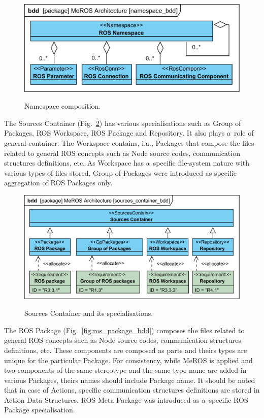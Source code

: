 \documentclass[11pt,oneside,a4paper]{report}
\begin{document}
	
	\begin{figure}[H]
		\centering
		\begin{center}
			{\includegraphics[scale=.94]{diagrams/namespace_bdd.png}}
		\end{center}
		\caption{Namespace composition.}
		\label{fig:namespace_bdd}
	\end{figure}
	
	The Sources Container (Fig.~\ref{fig:sources_container_bdd}) has various specialisations such as Group of Packages, ROS Workspace, ROS Package and Repository. It also plays a~role of general container.  
	The Workspace contains, i.a., Packages that compose the files related to general ROS concepts such as Node source codes, communication structures definitions, etc. As Workspace has a~specific file-system nature with various types of files stored, Group of Packages were introduced as specific aggregation of ROS Packages only.
	
	
	\begin{figure}[H]
		\centering
		\begin{center}
			{\includegraphics[scale=.94]{diagrams/sources_container_bdd.png}}
		\end{center}
		\caption{Sources Container and its specialisations.} 
		\label{fig:sources_container_bdd}
	\end{figure}
	
	The ROS Package (Fig.~\ref{fig:ros_package_bdd}) composes the files related to general ROS concepts such as Node source codes, communication structures definitions, etc. These components are composed as parts and theirs types are unique for the particular Package. For consistency, while MeROS is applied and two components of the same stereotype and the same type name are added in various Packages, theirs names should include Package name.  It should be noted that in case of Actions, specific communication structures definitions are stored in Action Data Structures. ROS Meta Package was introduced as a~specific ROS Package specialisation.
	
\end{document}

